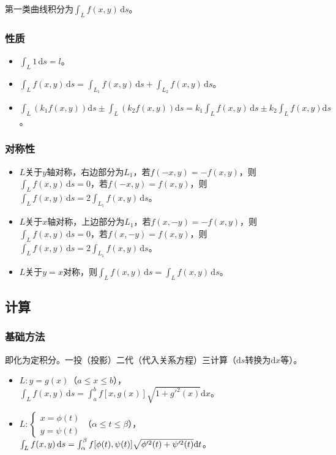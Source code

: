 \documentclass[UTF8, 12pt]{ctexart}
\begin{document}
第一类曲线积分为$\int_Lf(x,y)\,\textrm{d}s$。

\subsubsection{性质}

\begin{itemize}
    \item $\int_L1\,\textrm{d}s=l$。
    \item $\int_Lf(x,y)\,\textrm{d}s=\int_{L_1}f(x,y)\,\textrm{d}s+\int_{L_2}f(x,y)\,\textrm{d}s$。
    \item $\int_L(k_1f(x,y))\textrm{d}s\pm\int_L(k_2f(x,y))\textrm{d}s=k_1\int_Lf(x,y)\,\textrm{d}s\pm k_2\int_Lf(x,y)\textrm{d}s$。
\end{itemize}

\subsubsection{对称性}

\begin{itemize}
    \item $L$关于$y$轴对称，右边部分为$L_1$，若$f(-x,y)=-f(x,y)$，则$\int_Lf(x,y)\,\textrm{d}s=0$，若$f(-x,y)=f(x,y)$，则$\int_Lf(x,y)\,\textrm{d}s=2\int_{L_1}f(x,y)\,\textrm{d}s$。
    \item $L$关于$x$轴对称，上边部分为$L_1$，若$f(x,-y)=-f(x,y)$，则$\int_Lf(x,y)\,\textrm{d}s=0$，若$f(x,-y)=f(x,y)$，则$\int_Lf(x,y)\,\textrm{d}s=2\int_{L_1}f(x,y)\,\textrm{d}s$。
    \item $L$关于$y=x$对称，则$\int_Lf(x,y)\,\textrm{d}s=\int_Lf(x,y)\,\textrm{d}s$。
\end{itemize}

\subsection{计算}

\subsubsection{基础方法}

即化为定积分。一投（投影）二代（代入关系方程）三计算（$\textrm{d}s$转换为$\textrm{d}x$等）。

\begin{itemize}
    \item $L:y=g(x)$（$a\leqslant x\leqslant b$），$\int_Lf(x,y)\,\textrm{d}s=\int_a^bf[x,g(x)]\sqrt{1+g'^2(x)}\textrm{d}x$。
    \item $L:\left\{\begin{array}{c}
        x=\phi(t) \\
        y=\psi(t)
    \end{array}\right.$（$\alpha\leqslant t\leqslant\beta$），$\int_Lf(x,y)\,\textrm{d}s=\int_\alpha^\beta f[\phi(t),\psi(t)]\\\sqrt{\phi'^2(t)+\psi'^2(t)}\textrm{d}t$。 
\end{itemize}
\end{document}
